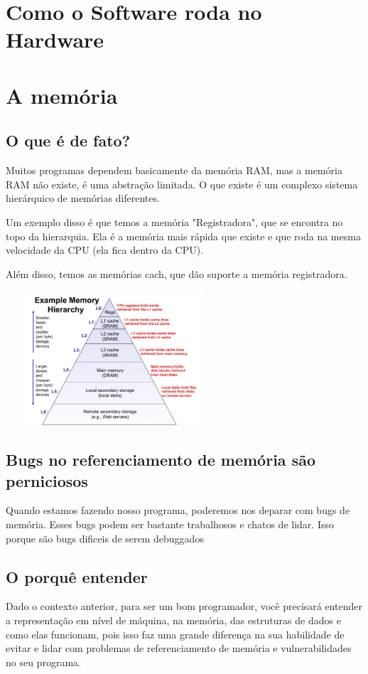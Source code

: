 \documentclass[12pt,a4paper]{report}
\begin{document}
	\section{Como o Software roda no Hardware}
	
	\section{A memória}
	\subsection{O que é de fato?}
	Muitos programas dependem basicamente da memória RAM, mas a memória RAM não existe, é uma abstração limitada. O que existe é um complexo
	sistema hierárquico de memórias diferentes.
	
	Um exemplo disso é que temos a memória "Registradora", que se encontra no topo da hierarquia. Ela é a memória mais rápida que existe e que roda na mesma velocidade da CPU (ela fica dentro da CPU).
	
	Além disso, temos as memórias cach, que dão suporte a memória registradora.
	
	\begin{center}

		\includegraphics[width=8cm,height=5cm,keepaspectratio=false]{imagens-teoria/hierarquia_memoria.png}
		
	\end{center}
	
	\subsection{Bugs no referenciamento de memória são perniciosos}
	Quando estamos fazendo nosso programa, poderemos nos deparar com bugs de memória. Esses bugs podem ser bastante trabalhosos e chatos de lidar. Isso porque são bugs dificeis de serem debuggados
	\subsection{O porquê entender}
	Dado o contexto anterior, para ser um bom programador, você precisará entender a representação em nível de máquina, na memória, das estruturas de dados e como elas funcionam, pois isso faz uma grande diferença na sua habilidade de evitar e lidar com problemas de referenciamento de memória e vulnerabilidades no seu programa.
	
\end{document}

